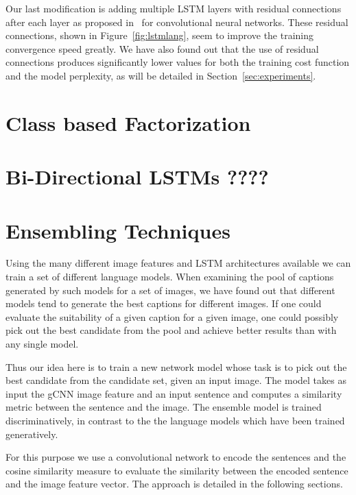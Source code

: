 Our last modification is adding multiple LSTM layers with residual connections
after each layer as proposed in~\cite{He2015} for convolutional neural networks.
These residual connections, shown in Figure~\ref{fig:lstmlang}, seem to improve
the training convergence speed greatly.
We have also found out that the use of residual connections produces
significantly lower values for both the training cost function and the model
perplexity, as will be detailed in Section~\ref{sec:experiments}.

\section{Class based Factorization}
\section{Bi-Directional LSTMs ????}
\section{Ensembling Techniques}
Using the many different image features and LSTM architectures available we can
train a set of different language models. 
When examining the pool of captions generated by such models for a set of
images, we have found out that different models tend to generate the best
captions for different images.
If one could evaluate the suitability of a given caption for a given image, one
could possibly pick out the best candidate from the pool and achieve better
results than with any single model.

Thus our idea here is to train a new network model whose task is to pick out the
best candidate from the candidate set, given an input image. 
The model takes as input the gCNN image feature and an input sentence and
computes a similarity metric between the sentence and the image. 
The ensemble model is trained discriminatively, in contrast to the the language
models which have been trained generatively.

For this purpose we use a convolutional network to encode the sentences and the
cosine similarity measure to evaluate the similarity between the encoded
sentence and the image feature vector. 
The approach is detailed in the following sections.

